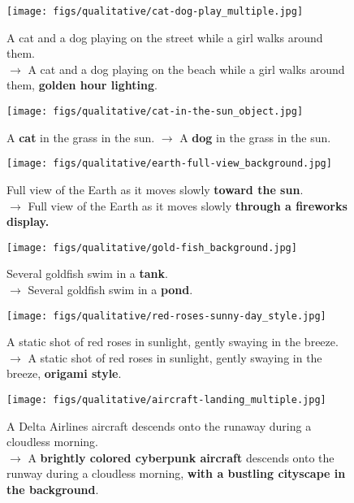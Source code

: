 \begin{figure}
    \centering
    \texttt{[image: figs/qualitative/cat-dog-play\_multiple.jpg]}
    \caption{A cat and a dog playing on the street while a girl walks around them. \\ $\rightarrow$ A cat and a dog playing on the beach while a girl walks around them, \textbf{golden hour lighting}.}\label{fig.additional_qua2}
\end{figure}

\begin{figure}
    \centering
    \texttt{[image: figs/qualitative/cat-in-the-sun\_object.jpg]}
    \caption{A \textbf{cat} in the grass in the sun. $\rightarrow$ A \textbf{dog} in the grass in the sun.}\label{fig.additional_qua3}
\end{figure}

\begin{figure}
    \centering
    \texttt{[image: figs/qualitative/earth-full-view\_background.jpg]}
    \caption{Full view of the Earth as it moves slowly \textbf{toward the sun}. \\ $\rightarrow$ Full view of the Earth as it moves slowly \textbf{through a fireworks display.}}\label{fig.additional_qua4}
\end{figure}

\begin{figure}
    \centering
    \texttt{[image: figs/qualitative/gold-fish\_background.jpg]}
    \caption{Several goldfish swim in a \textbf{tank}. \\ $\rightarrow$ Several goldfish swim in a \textbf{pond}.}
    \label{fig.additional_qua5}
    
\end{figure}

\begin{figure}
    \centering
    \texttt{[image: figs/qualitative/red-roses-sunny-day\_style.jpg]}
    \caption{A static shot of red roses in sunlight, gently swaying in the breeze. \\ $\rightarrow$ A static shot of red roses in sunlight, gently swaying in the breeze, \textbf{origami style}.}
    \label{fig.additional_qua6}
\end{figure}

\begin{figure}
    \centering
    \texttt{[image: figs/qualitative/aircraft-landing\_multiple.jpg]}
    \caption{A Delta Airlines aircraft descends onto the runaway during a cloudless morning. \\ $\rightarrow$ A \textbf{brightly colored cyberpunk aircraft} descends onto the runway during a cloudless morning, \textbf{with a bustling cityscape in the background}.}
    \label{fig.additional_qua7}
\end{figure}

